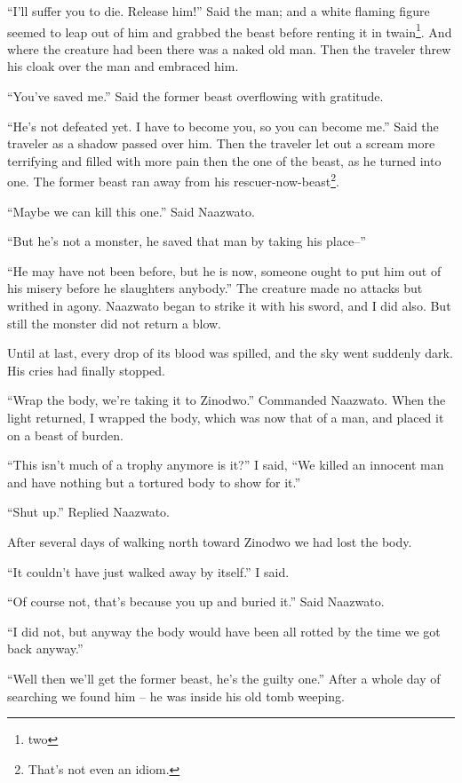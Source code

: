 ``I'll suffer you to die. Release him!'' Said the man; and a white flaming figure seemed to leap out of him and grabbed the beast before renting it in twain\footnote{two}.
And where the creature had been there was a naked old man. Then the traveler threw his cloak over the man and embraced him.

``You've saved me.'' Said the former beast overflowing with gratitude. 

``He's not defeated yet. I have to become you, so you can become me.'' Said the traveler as a shadow passed over him. Then the traveler let out a scream more terrifying and filled with more pain then the one of the beast, as he turned into one. The former beast ran away from his rescuer-now-beast\footnote{That's not even an idiom.}.

``Maybe we can kill this one.'' Said Naa\-zwa\-to.

``But he's not a monster, he saved that man by taking his place--''

``He may have not been before, but he is now, someone ought to put him out of his misery before he slaughters anybody.''
The creature made no attacks but writhed in agony. Naa\-zwa\-to began to strike it with his sword, and I did also. But still the monster did not return a blow.

Until at last, every drop of its blood was spilled, and the sky went suddenly dark. His cries had finally stopped.

``Wrap the body, we're taking it to Zi\-no\-dwo.'' Commanded Naa\-zwa\-to.
When the light returned, I wrapped the body, which was now that of a man, and placed it on a beast of burden.

``This isn't much of a trophy anymore is it?'' I said, ``We killed an innocent man and have nothing but a tortured body to show for it.''

``Shut up.'' Replied Naa\-zwa\-to.

After several days of walking north toward Zi\-no\-dwo we had lost the body.

``It couldn't have just walked away by itself.'' I said.

``Of course not, that's because you up and buried it.'' Said Naa\-zwa\-to.

``I did not, but anyway the body would have been all rotted by the time we got back anyway.''

``Well then we'll get the former beast, he's the guilty one.''
After a whole day of searching we found him -- he was inside his old tomb weeping.

